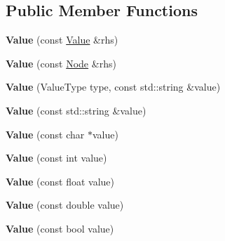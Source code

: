 \subsection*{Public Member Functions}
\begin{DoxyCompactItemize}
\item 
\hypertarget{class_jzon_1_1_value_afad65ce426209f080d9457af440f7288}{{\bfseries Value} (const \hyperlink{class_jzon_1_1_value}{Value} \&rhs)}\label{class_jzon_1_1_value_afad65ce426209f080d9457af440f7288}

\item 
\hypertarget{class_jzon_1_1_value_a7647574ac67ba6b893e7cd1816478928}{{\bfseries Value} (const \hyperlink{class_jzon_1_1_node}{Node} \&rhs)}\label{class_jzon_1_1_value_a7647574ac67ba6b893e7cd1816478928}

\item 
\hypertarget{class_jzon_1_1_value_a96eb79fb74d4a58ba265768483687785}{{\bfseries Value} (Value\-Type type, const std\-::string \&value)}\label{class_jzon_1_1_value_a96eb79fb74d4a58ba265768483687785}

\item 
\hypertarget{class_jzon_1_1_value_acc14b12aaf5821945db6e66f51025aa0}{{\bfseries Value} (const std\-::string \&value)}\label{class_jzon_1_1_value_acc14b12aaf5821945db6e66f51025aa0}

\item 
\hypertarget{class_jzon_1_1_value_a50ad69707bebef4b26f708a4d0a272ce}{{\bfseries Value} (const char $\ast$value)}\label{class_jzon_1_1_value_a50ad69707bebef4b26f708a4d0a272ce}

\item 
\hypertarget{class_jzon_1_1_value_a0c20325c8d3b407ad4ec025e4f182b87}{{\bfseries Value} (const int value)}\label{class_jzon_1_1_value_a0c20325c8d3b407ad4ec025e4f182b87}

\item 
\hypertarget{class_jzon_1_1_value_a634fe3f4c85eb6fd1b205aaa1fe16f13}{{\bfseries Value} (const float value)}\label{class_jzon_1_1_value_a634fe3f4c85eb6fd1b205aaa1fe16f13}

\item 
\hypertarget{class_jzon_1_1_value_a6d3057edd2b44dd186b6d0626d642dc0}{{\bfseries Value} (const double value)}\label{class_jzon_1_1_value_a6d3057edd2b44dd186b6d0626d642dc0}

\item 
\hypertarget{class_jzon_1_1_value_a63139d2fe9ea9e19506497e6ee5a1aaf}{{\bfseries Value} (const bool value)}\label{class_jzon_1_1_value_a63139d2fe9ea9e19506497e6ee5a1aaf}


\end{DoxyCompactItemize}
